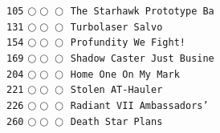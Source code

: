 \documentclass[a4paper,landscape]{article}
\begin{document}
\begin{multicols*}{5}
\texttt{105} \(\bigcirc\!\bigcirc\!\bigcirc\)  \texttt{The Starhawk Prototype Ba} \vspace{-0.3mm}\\ 
\texttt{131} \(\bigcirc\!\bigcirc\!\bigcirc\)  \texttt{Turbolaser Salvo} \vspace{-0.3mm}\\ 
\texttt{154} \(\bigcirc\!\bigcirc\!\bigcirc\)  \texttt{Profundity We Fight!} \vspace{-0.3mm}\\ 
\texttt{169} \(\bigcirc\!\bigcirc\!\bigcirc\)  \texttt{Shadow Caster Just Busine} \vspace{-0.3mm}\\ 
\texttt{204} \(\bigcirc\!\bigcirc\!\bigcirc\)  \texttt{Home One On My Mark} \vspace{-0.3mm}\\ 
\texttt{221} \(\bigcirc\!\bigcirc\!\bigcirc\)  \texttt{Stolen AT-Hauler} \vspace{-0.3mm}\\ 
\texttt{226} \(\bigcirc\!\bigcirc\!\bigcirc\)  \texttt{Radiant VII Ambassadors' } \vspace{-0.3mm}\\ 
\texttt{260} \(\bigcirc\!\bigcirc\!\bigcirc\)  \texttt{Death Star Plans} \vspace{-0.3mm}\\ 

\end{multicols*}
\end{document}
